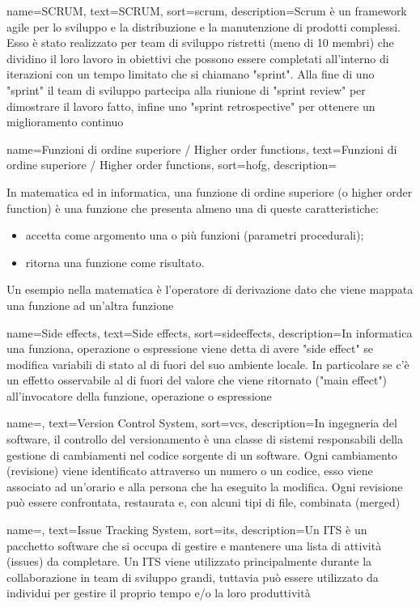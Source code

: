 {
	name=SCRUM,
	text=SCRUM,
	sort=scrum,
	description={Scrum è un framework agile per lo sviluppo e la distribuzione e la manutenzione di prodotti complessi. Esso è stato realizzato per team di sviluppo ristretti (meno di 10 membri) che dividino il loro lavoro in obiettivi che possono essere completati all'interno di iterazioni con un tempo limitato che si chiamano "sprint". Alla fine di uno "sprint" il team di sviluppo partecipa alla riunione di "sprint review" per dimostrare il lavoro fatto, infine uno "sprint retrospective" per ottenere un miglioramento continuo}
}

{
	name=Funzioni di ordine superiore / Higher order functions,
	text=Funzioni di ordine superiore / Higher order functions,
	sort=hofg,
	description={
		In matematica ed in informatica, una funzione di ordine superiore (o higher order function) è una funzione che presenta almeno una di queste caratteristiche:
		\begin{itemize}
			\item accetta come argomento una o più funzioni (parametri procedurali);
			\item ritorna una funzione come risultato.
		\end{itemize}
		Un esempio nella matematica è l'operatore di derivazione dato che viene mappata una funzione ad un'altra funzione}
}

{
	name=Side effects,
	text=Side effects,
	sort=sideeffects,
	description={In informatica una funziona, operazione o espressione viene detta di avere "side effect" se modifica variabili di stato al di fuori del suo ambiente locale. In particolare se c'è un effetto osservabile al di fuori del valore che viene ritornato ("main effect") all'invocatore della funzione, operazione o espressione}
}

{
	name=,
	text=Version Control System,
	sort=vcs,
	description={In ingegneria del software, il controllo del versionamento è una classe di sistemi responsabili della gestione di cambiamenti nel codice sorgente di un software. Ogni cambiamento (revisione) viene identificato attraverso un numero o un codice, esso viene associato ad un'orario e alla persona che ha eseguito la modifica. Ogni revisione può essere confrontata, restaurata e, con alcuni tipi di file, combinata (merged)}
}

{
	name=,
	text=Issue Tracking System,
	sort=its,
	description={Un ITS è un pacchetto software che si occupa di gestire e mantenere una lista di attività (issues) da completare. Un ITS viene utilizzato principalmente durante la collaborazione in team di sviluppo grandi, tuttavia può essere utilizzato da individui per gestire il proprio tempo e/o la loro produttività}
}

